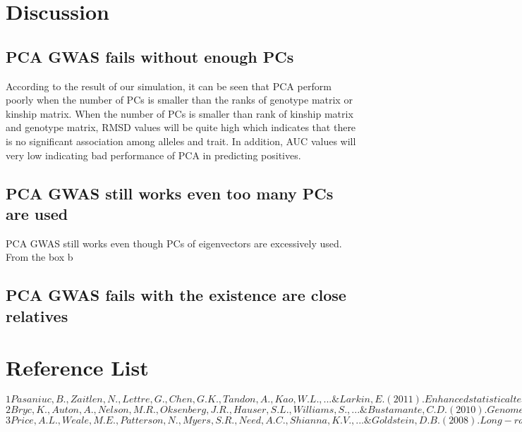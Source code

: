\documentclass[12pt]{article}
\theoremstyle{definition}
\theoremstyle{plain}
\begin{document}
\section{Discussion}
\subsection{PCA GWAS fails without enough PCs}
According to the result of our simulation, it can be seen that PCA perform poorly when the number of PCs is smaller than the ranks of genotype matrix or kinship matrix. When the number of PCs is smaller than rank of kinship matrix and genotype matrix, RMSD values will be quite high which indicates that there is no significant association among alleles and trait. In addition, AUC values will very low indicating bad performance of PCA in predicting positives. 
\subsection{PCA GWAS still works even too many PCs are used}
PCA GWAS still works even though PCs of eigenvectors are excessively used. From the box b



\subsection{PCA GWAS fails with the existence are close relatives }



\section{Reference List}
$
1
Pasaniuc, B., Zaitlen, N., Lettre, G., Chen, G. K., Tandon, A., Kao, W. L., ... \& Larkin, E. (2011). Enhanced statistical tests for GWAS in admixed populations: assessment using African Americans from CARe and a Breast Cancer Consortium. PLoS genetics, 7(4), e1001371.
$\\

$
2
Bryc, K., Auton, A., Nelson, M. R., Oksenberg, J. R., Hauser, S. L., Williams, S., ... \& Bustamante, C. D. (2010). Genome-wide patterns of population structure and admixture in West Africans and African Americans. Proceedings of the National Academy of Sciences, 107(2), 786-791.
$\\

$
3
Price, A. L., Weale, M. E., Patterson, N., Myers, S. R., Need, A. C., Shianna, K. V., ... \& Goldstein, D. B. (2008). Long-range LD can confound genome scans in admixed populations. The American Journal of Human Genetics, 83(1), 132-135.
$\\
\end{document}
